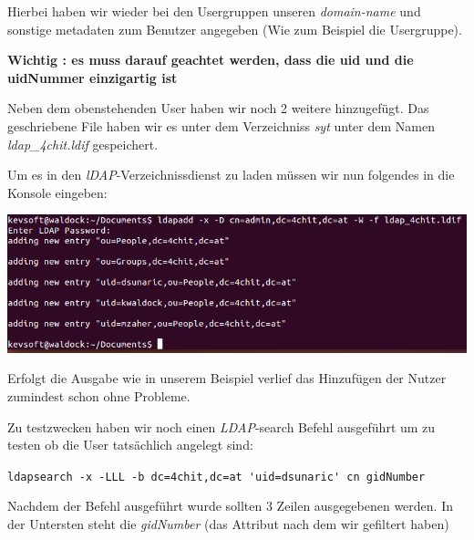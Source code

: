 Hierbei haben wir wieder bei den Usergruppen unseren \textit{domain-name} und sonstige metadaten zum Benutzer angegeben (Wie zum Beispiel die Usergruppe).

\textbf{Wichtig : es muss darauf geachtet werden, dass die uid und die uidNummer einzigartig ist}

Neben dem obenstehenden User haben wir noch 2 weitere hinzugefügt.
Das geschriebene File haben wir es unter dem Verzeichniss \textit{syt} unter dem Namen \textit{ldap\_4chit.ldif} gespeichert.

Um es in den \textit{lDAP}-Verzeichnissdienst zu laden müssen wir nun folgendes in die Konsole eingeben: 
\begin{center}
	\includegraphics[width=1.0\linewidth]{images/a3_ldapadd.PNG}
\end{center}

Erfolgt die Ausgabe wie in unserem Beispiel verlief das Hinzufügen der Nutzer zumindest schon ohne Probleme.

Zu testzwecken haben wir noch einen \textit{LDAP}-search Befehl ausgeführt um zu testen ob die User tatsächlich angelegt sind:

\verb|ldapsearch -x -LLL -b dc=4chit,dc=at 'uid=dsunaric' cn gidNumber|

Nachdem der Befehl ausgeführt wurde sollten 3 Zeilen ausgegebenen werden. In der Untersten steht die \textit{gidNumber} (das Attribut nach dem wir gefiltert haben)